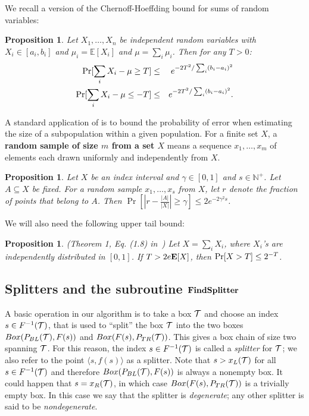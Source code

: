\documentclass{acmsmall}
\newtheorem{prop}[theorem]{Proposition}
\newcommand{\cT}{{\cal T}}
\newcommand{\bx}{Box}
\newcommand{\pr}{{\rm Pr}}
\newcommand{\EX}{\hbox{\bf E}}
\newcommand{\findsplitter}{{\rm {\bf FindSplitter}}}
\begin{document}
We recall a version of the Chernoff-Hoeffding bound for sums
of random variables:


\begin{prop}
\label{prop:hoeff1}
\cite{Ho63}
Let $X_1,\ldots,X_n$ be independent random variables with $X_i \in [a_i,b_i]$
and $\mu_i=\mathbb{E}[X_i]$ and $\mu=\sum_i \mu_i$.  Then for any $T>0$:
\begin{eqnarray*}
\pr[\sum_i X_i - \mu \geq T] & \leq & e^{-2T^2/\sum_i (b_i-a_i)^2}\\
\pr[\sum_i X_i - \mu \leq -T] & \leq & e^{-2T^2/\sum_i (b_i-a_i)^2}.
\end{eqnarray*}

\end{prop}

A standard application of is to bound
the probability of error when estimating the size of a subpopulation within
a given population. 
For a finite set $X$,  a {\bf random sample of 
size $m$ from a set $X$} means a sequence
$x_1,\ldots,x_m$ of elements each drawn uniformly and independently  from $X$. 

\begin{prop}
\label{prop:hoeff2}
Let $X$ be an index interval and $\gamma \in [0,1]$ and
$s \in \mathbb{N}^+$.
Let $A \subseteq X$ be fixed.
For a random sample  $x_1,\ldots,x_s$ from $X$,
let $r$ denote the fraction of points 
that belong to $A$.
Then
$\Pr[|r - \frac{|A|}{|X|}| \geq \gamma] \leq 2e^{-2\gamma^2s}$.
\end{prop}

We will also need the following upper tail bound:

\begin{prop}
\label{prop:cher} (Theorem 1, Eq. (1.8) in~\cite{DuPa})
Let $X = \sum_i X_i$, where $X_i$'s are independently distributed in $[0,1]$. 
If $T > 2e\EX[X]$, then $\pr[X > T] \leq 2^{-T}$.
\end{prop}



\subsection{Splitters and the subroutine $\findsplitter$}
\label{subsec:splitters}

A basic operation in our algorithm is to take a box $\cT$ and choose an index $s \in F^{-1}(\cT)$, that is used 
to ``split'' the box $\cT$ into the two boxes $\bx(P_{BL}(\cT),F(s))$ and $\bx(F(s),P_{TR}(\cT))$.
This gives a box chain of size two spanning $\cT$.  
For this reason, the index $s \in F^{-1}(\cT)$ is called a {\em splitter} for $\cT$; we also refer to
the point $\langle s,f(s) \rangle$ as a splitter.   Note that $s>x_L(\cT)$ for all $s \in F^{-1}(\cT)$ and therefore
 $\bx(P_{BL}(\cT),F(s))$ is always a nonempty box.  
It could happen that $s = x_R(\cT)$, in which case $\bx(F(s),P_{TR}(\cT))$ is a trivially empty box.
In this case we say that the splitter
 is {\em degenerate};  any other splitter is said to be  {\em nondegenerate}.    
\end{document}
